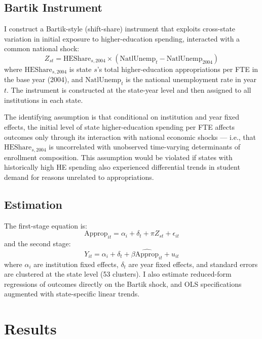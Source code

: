 \documentclass[12pt]{article}
\begin{document}
\subsection{Bartik Instrument}

I construct a Bartik-style (shift-share) instrument that exploits cross-state variation in initial exposure to higher-education spending, interacted with a common national shock:
\begin{equation}
Z_{st} = \text{HEShare}_{s,2004} \times (\text{NatlUnemp}_t - \text{NatlUnemp}_{2004})
\label{eq:bartik}
\end{equation}
where $\text{HEShare}_{s,2004}$ is state $s$'s total higher-education appropriations per FTE in the base year (2004), and $\text{NatlUnemp}_t$ is the national unemployment rate in year $t$. The instrument is constructed at the state-year level and then assigned to all institutions in each state.

The identifying assumption is that conditional on institution and year fixed effects, the initial level of state higher-education spending per FTE affects outcomes only through its interaction with national economic shocks --- i.e., that $\text{HEShare}_{s,2004}$ is uncorrelated with unobserved time-varying determinants of enrollment composition. This assumption would be violated if states with historically high HE spending also experienced differential trends in student demand for reasons unrelated to appropriations.

\subsection{Estimation}

The first-stage equation is:
\begin{equation}
\text{Approp}_{it} = \alpha_i + \delta_t + \pi Z_{st} + \epsilon_{it}
\end{equation}
and the second stage:
\begin{equation}
Y_{it} = \alpha_i + \delta_t + \beta \widehat{\text{Approp}}_{it} + u_{it}
\end{equation}
where $\alpha_i$ are institution fixed effects, $\delta_t$ are year fixed effects, and standard errors are clustered at the state level (53 clusters). I also estimate reduced-form regressions of outcomes directly on the Bartik shock, and OLS specifications augmented with state-specific linear trends.

\section{Results}
\label{sec:results}
\end{document}
